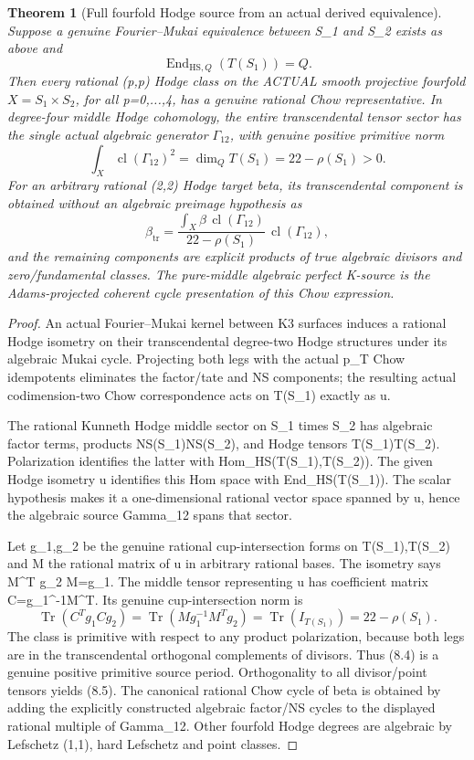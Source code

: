 \documentclass[11pt]{article}
\newcommand{\cl}{\operatorname{cl}}
\newtheorem{theorem}{Theorem}[section]
\begin{document}
\begin{theorem}[Full fourfold Hodge source from an actual derived equivalence]
Suppose a genuine Fourier--Mukai equivalence
between S_1 and S_2 exists as above and
\[
 \boxed{
 \operatorname{End}_{\mathrm{HS},Q}(T(S_1))=Q.}      \tag{8.3}
\]
Then every rational (p,p) Hodge class on
the ACTUAL smooth projective fourfold
\(X=S_1\times S_2\), for all p=0,...,4,
has a genuine rational Chow representative.
In degree-four middle Hodge cohomology,
the entire transcendental tensor sector
has the single actual algebraic generator
\(\Gamma_{12}\), with genuine positive
primitive norm
\[
 \boxed{
 \int_X\cl(\Gamma_{12})^2
       =\dim_Q T(S_1)=22-\rho(S_1)>0.}             \tag{8.4}
\]
For an arbitrary rational (2,2)
Hodge target beta, its transcendental
component is obtained without an
algebraic preimage hypothesis as
\[
 \boxed{
 \beta_{\mathrm{tr}}
   =\frac{\int_X\beta\,\cl(\Gamma_{12})}
           {22-\rho(S_1)}\,\cl(\Gamma_{12}),}       \tag{8.5}
\]
and the remaining components are
explicit products of true algebraic
divisors and zero/fundamental classes.
The pure-middle algebraic perfect
K-source is the Adams-projected coherent
cycle presentation of this Chow expression.
\end{theorem}
\begin{proof}
An actual Fourier--Mukai kernel between K3
surfaces induces a rational Hodge
isometry on their transcendental degree-two
Hodge structures under its algebraic
Mukai cycle. Projecting both legs
with the actual p_T Chow idempotents
eliminates the factor/tate and NS
components; the resulting actual
codimension-two Chow correspondence
acts on T(S_1) exactly as u.

The rational Kunneth Hodge middle
sector on S_1 times S_2 has
algebraic factor terms, products
NS(S_1)\otimes NS(S_2),
and Hodge tensors
T(S_1)\otimes T(S_2).
Polarization identifies the latter
with Hom_HS(T(S_1),T(S_2)).
The given Hodge isometry u identifies
this Hom space with End_HS(T(S_1)).
The scalar hypothesis makes it a
one-dimensional rational vector space
spanned by u, hence the algebraic
source Gamma_12 spans that sector.

Let g_1,g_2 be the genuine rational
cup-intersection forms on T(S_1),T(S_2)
and M the rational matrix of u in
arbitrary rational bases.
The isometry says M^T g_2 M=g_1.
The middle tensor representing u has
coefficient matrix C=g_1^{-1}M^T.
Its genuine cup-intersection norm is
\[
 \operatorname{Tr}(C^Tg_1Cg_2)
 =\operatorname{Tr}(M g_1^{-1}M^T g_2)
 =\operatorname{Tr}(I_{T(S_1)})
 =22-\rho(S_1).
\]
The class is primitive with respect
to any product polarization, because
both legs are in the transcendental
orthogonal complements of divisors.
Thus (8.4) is a genuine positive
primitive source period. Orthogonality
to all divisor/point tensors yields
(8.5). The canonical rational Chow
cycle of beta is obtained by adding
the explicitly constructed algebraic
factor/NS cycles to the displayed
rational multiple of Gamma_12.
Other fourfold Hodge degrees are
algebraic by Lefschetz (1,1),
hard Lefschetz and point classes.
\end{proof}
\end{document}
